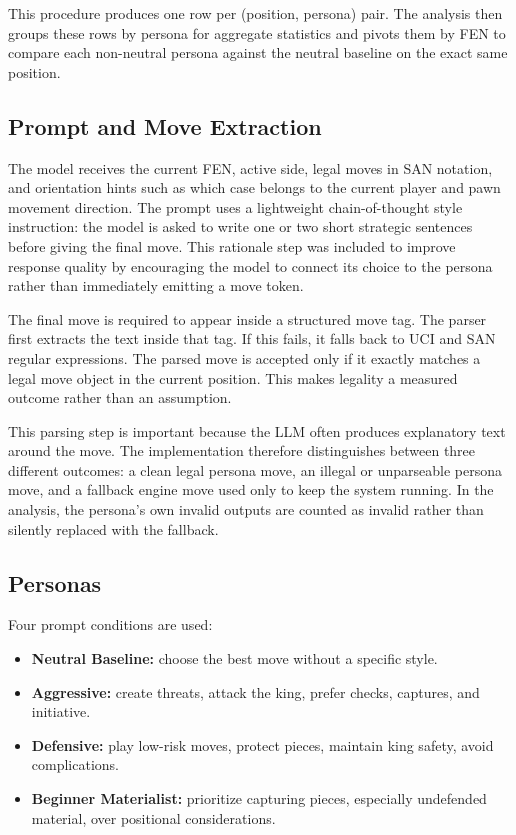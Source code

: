 \documentclass[10pt]{article}
\begin{document}
This procedure produces one row per (position, persona) pair. The analysis then groups these rows by persona for aggregate statistics and pivots them by FEN to compare each non-neutral persona against the neutral baseline on the exact same position.

\subsection{Prompt and Move Extraction}

The model receives the current FEN, active side, legal moves in SAN notation, and orientation hints such as which case belongs to the current player and pawn movement direction. The prompt uses a lightweight chain-of-thought style instruction: the model is asked to write one or two short strategic sentences before giving the final move. This rationale step was included to improve response quality by encouraging the model to connect its choice to the persona rather than immediately emitting a move token.

The final move is required to appear inside a structured move tag. The parser first extracts the text inside that tag. If this fails, it falls back to UCI and SAN regular expressions. The parsed move is accepted only if it exactly matches a legal move object in the current position. This makes legality a measured outcome rather than an assumption.

This parsing step is important because the LLM often produces explanatory text around the move. The implementation therefore distinguishes between three different outcomes: a clean legal persona move, an illegal or unparseable persona move, and a fallback engine move used only to keep the system running. In the analysis, the persona's own invalid outputs are counted as invalid rather than silently replaced with the fallback.

\subsection{Personas}

Four prompt conditions are used:

\begin{itemize}
    \item \textbf{Neutral Baseline:} choose the best move without a specific style.
    \item \textbf{Aggressive:} create threats, attack the king, prefer checks, captures, and initiative.
    \item \textbf{Defensive:} play low-risk moves, protect pieces, maintain king safety, avoid complications.
    \item \textbf{Beginner Materialist:} prioritize capturing pieces, especially undefended material, over positional considerations.
\end{itemize}
\end{document}
